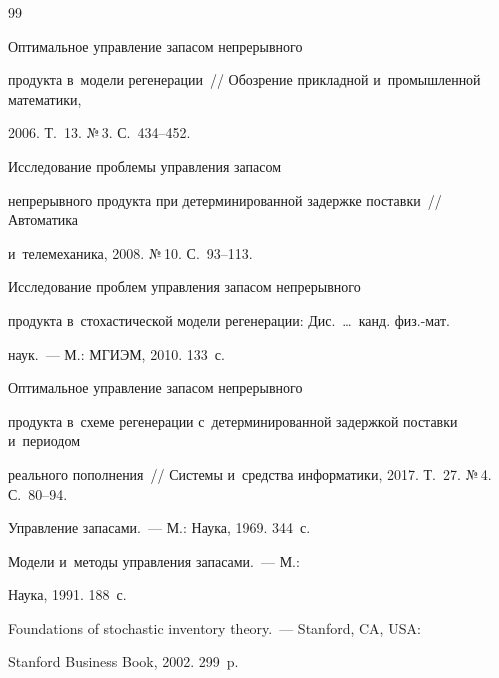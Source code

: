 {\small\frenchspacing

{%


\begin{thebibliography}{99}


   Оптимальное управление запасом непрерывного 

продукта в~модели регенерации~/\!\!/ Обозрение прикладной и~промышленной математики, 

2006. Т.~13. №\,3. С.~434--452. 


   Исследование проблемы управления запасом 

непрерывного продукта при детерминированной задержке поставки~/\!\!/ Автоматика 

и~телемеханика, 2008. №\,10. С.~93--113.


   Исследование проблем управления запасом непрерывного 

продукта в~стохастической модели регенерации: Дис.\ \ldots\ канд. физ.-мат. 

наук.~--- М.: МГИЭМ, 2010. 133~с.


   Оптимальное управление запасом непрерывного 

продукта в~схеме регенерации с~детерминированной задержкой поставки и~периодом 

реального пополнения~/\!\!/ Системы и~средства информатики, 2017. Т.~27. №\,4. С.~80--94.


   Управление запасами.~--- М.: Наука, 1969. 344~с.


   Модели и~методы управления запасами.~--- М.: 

Наука, 1991. 188~с.


   Foundations of stochastic inventory theory.~--- Stanford, CA, USA: 

Stanford Business Book, 2002. 299~p.



\end{thebibliography}}}
